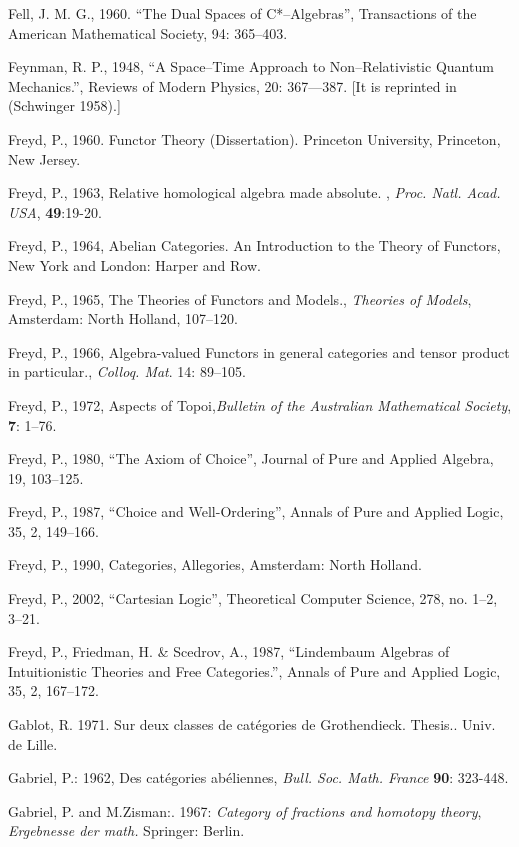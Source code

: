 \documentclass[12pt]{article}
\begin{document}
\begin{thebibliography}{399}
Fell, J. M. G., 1960. ``The Dual Spaces of  C*--Algebras'', Transactions of the 
American Mathematical Society, 94: 365--403. 

Feynman, R. P., 1948, ``A Space--Time Approach to Non--Relativistic Quantum 
Mechanics.'', Reviews of Modern Physics, 20: 367---387. [It is reprinted in 
(Schwinger 1958).] 

Freyd, P., 1960. Functor Theory (Dissertation). Princeton University, Princeton, New Jersey.
 
Freyd, P., 1963, Relative homological algebra made absolute. , {\em Proc. Natl. Acad. USA}, \textbf{49}:19-20.
  
Freyd, P., 1964, Abelian Categories. An Introduction to the Theory of Functors, New York and London: Harper and Row.  

Freyd, P., 1965, The Theories of Functors and Models., {\em Theories of Models}, Amsterdam: North Holland, 107--120. 

Freyd, P., 1966, Algebra-valued Functors in general categories and tensor product in particular., {\em Colloq. Mat}. 
{14}: 89--105.

Freyd, P., 1972, Aspects of Topoi,{\em Bulletin of the Australian Mathematical Society}, \textbf{7}: 1--76.  

Freyd, P., 1980, ``The Axiom of Choice'', Journal of Pure and Applied Algebra, 19, 103--125. 

Freyd, P., 1987, ``Choice and Well-Ordering'', Annals of Pure and Applied Logic, 35, 2, 149--166.  

Freyd, P., 1990, Categories, Allegories, Amsterdam: North Holland. 

Freyd, P., 2002, ``Cartesian Logic'', Theoretical Computer Science, 278, no. 1--2, 3--21.  

Freyd, P., Friedman, H. \& Scedrov, A., 1987, ``Lindembaum Algebras of Intuitionistic Theories and Free Categories.'', Annals of Pure and Applied Logic, 35, 2, 167--172.

Gablot, R. 1971. Sur deux classes de cat\'{e}gories de Grothendieck. Thesis..  Univ. de Lille.

Gabriel, P.: 1962, Des cat\'egories ab\'eliennes, \emph{Bull. Soc.
Math. France} \textbf{90}: 323-448.

Gabriel, P. and M.Zisman:. 1967: \emph{Category of fractions and homotopy theory}, \emph{Ergebnesse der math.} Springer: Berlin.


\end{thebibliography}
\end{document}
